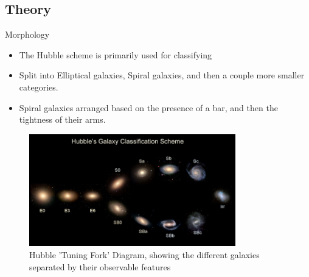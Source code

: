 \documentclass{beamer}
\begin{document}
\subsection{Theory}
\begin{frame}{Morphology}
    \begin{alertblock}{}
    \begin{itemize}
        \item The Hubble scheme is primarily used for classifying
        \item Split into Elliptical galaxies, Spiral galaxies, and then a couple more smaller categories.
        \item Spiral galaxies arranged based on the presence of a bar, and then the tightness of their arms.
    \end{itemize}
    \end{alertblock}
    \begin{figure}
        \centering
        \includegraphics[width=0.8\textwidth, height=0.4\textheight]{Figures/hubbletuningfork.jpeg}
        \caption{Hubble 'Tuning Fork' Diagram, showing the different galaxies separated by their observable features}
        \label{fig:htuning}
    \end{figure}
    
\end{frame}
\end{document}

